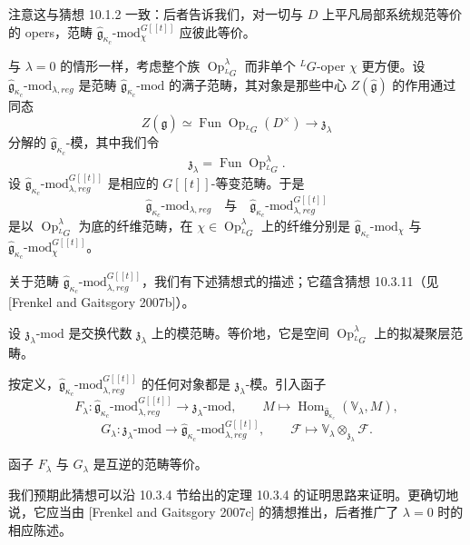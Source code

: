 注意这与猜想 10.1.2 一致：后者告诉我们，对一切与 $D$ 上平凡局部系统规范等价的 opers，范畴 $\hat{\mathfrak{g}}_{\kappa_c}\text{-mod}^{G[[t]]}_\chi$ 应彼此等价。

与 $\lambda=0$ 的情形一样，考虑整个族 $\operatorname{Op}^\lambda_{{}^LG}$ 而非单个 ${}^LG$-oper $\chi$ 更方便。设 $\hat{\mathfrak{g}}_{\kappa_c}\text{-mod}_{\lambda,reg}$ 是范畴 $\hat{\mathfrak{g}}_{\kappa_c}\text{-mod}$ 的满子范畴，其对象是那些中心 $Z(\hat{\mathfrak{g}})$ 的作用通过同态
\[
    Z(\hat{\mathfrak{g}})\simeq\operatorname{Fun}\operatorname{Op}_{{}^LG}(D^\times)
    \to\mathfrak{z}_\lambda
\]
分解的 $\hat{\mathfrak{g}}_{\kappa_c}$-模，其中我们令
\[
    \mathfrak{z}_\lambda=\operatorname{Fun}\operatorname{Op}^\lambda_{{}^LG}.
\]
设 $\hat{\mathfrak{g}}_{\kappa_c}\text{-mod}^{G[[t]]}_{\lambda,reg}$ 是相应的 $G[[t]]$-等变范畴。于是
\[
    \hat{\mathfrak{g}}_{\kappa_c}\text{-mod}_{\lambda,reg}
    \quad\text{与}\quad
    \hat{\mathfrak{g}}_{\kappa_c}\text{-mod}^{G[[t]]}_{\lambda,reg}
\]
是以 $\operatorname{Op}^\lambda_{{}^LG}$ 为底的纤维范畴，在 $\chi\in\operatorname{Op}^\lambda_{{}^LG}$ 上的纤维分别是 $\hat{\mathfrak{g}}_{\kappa_c}\text{-mod}_\chi$ 与 $\hat{\mathfrak{g}}_{\kappa_c}\text{-mod}^{G[[t]]}_\chi$。

关于范畴 $\hat{\mathfrak{g}}_{\kappa_c}\text{-mod}^{G[[t]]}_{\lambda,reg}$，我们有下述猜想式的描述；它蕴含猜想 10.3.11（见 [Frenkel and Gaitsgory 2007b]）。

设 $\mathfrak{z}_\lambda\text{-mod}$ 是交换代数 $\mathfrak{z}_\lambda$ 上的模范畴。等价地，它是空间 $\operatorname{Op}^\lambda_{{}^LG}$ 上的拟凝聚层范畴。

按定义，$\hat{\mathfrak{g}}_{\kappa_c}\text{-mod}^{G[[t]]}_{\lambda,reg}$ 的任何对象都是 $\mathfrak{z}_\lambda$-模。引入函子
\[
    F_\lambda:\hat{\mathfrak{g}}_{\kappa_c}\text{-mod}^{G[[t]]}_{\lambda,reg}
    \to\mathfrak{z}_\lambda\text{-mod},
    \qquad M\mapsto\operatorname{Hom}_{\hat{\mathfrak{g}}_{\kappa_c}}(\mathbb{V}_\lambda,M),
\]
\[
    G_\lambda:\mathfrak{z}_\lambda\text{-mod}
    \to\hat{\mathfrak{g}}_{\kappa_c}\text{-mod}^{G[[t]]}_{\lambda,reg},
    \qquad \mathcal{F}\mapsto\mathbb{V}_\lambda\otimes_{\mathfrak{z}_\lambda}\mathcal{F}.
\]

\begin{conjecture}
    函子 $F_\lambda$ 与 $G_\lambda$ 是互逆的范畴等价。
\end{conjecture}

我们预期此猜想可以沿 10.3.4 节给出的定理 10.3.4 的证明思路来证明。更确切地说，它应当由 [Frenkel and Gaitsgory 2007c] 的猜想推出，后者推广了 $\lambda=0$ 时的相应陈述。

